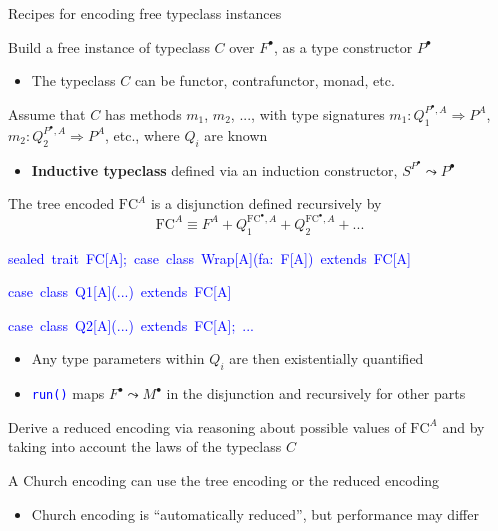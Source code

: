 \documentclass[english,,russian]{beamer}
\newenvironment{lyxcode}
  {\par\begin{list}{}{
    \setlength{\rightmargin}{\leftmargin}
    \setlength{\listparindent}{0pt}%
    \raggedright
    \setlength{\itemsep}{0pt}
    \setlength{\parsep}{0pt}
    \normalfont\ttfamily}%
   \def\{{\char`\{}
   \def\}{\char`\}}
   \def\textasciitilde{\char`\~}
   \item[]}
  {\end{list}}
\begin{document}
\begin{frame}{Recipes for encoding free typeclass instances}
\begin{itemize}
\item Build a free instance of typeclass $C$ over $F^{\bullet}$, as a
type constructor $P^{\bullet}$ 
\begin{itemize}
\item The typeclass $C$ can be functor, contrafunctor, monad, etc.
\end{itemize}
\item Assume that $C$ has methods $m_{1}$, $m_{2}$, ..., with type signatures
{\footnotesize{}$m_{1}:Q_{1}^{P^{\bullet},A}\Rightarrow P^{A}$},
{\footnotesize{}$m_{2}:Q_{2}^{P^{\bullet},A}\Rightarrow P^{A}$},
etc., where $Q_{i}$ are known
\begin{itemize}
\item \textbf{Inductive typeclass} defined via an induction constructor,
$S^{P^{\bullet}}\leadsto P^{\bullet}$
\end{itemize}
\item The tree encoded $\text{FC}^{A}$ is a disjunction defined recursively
by{\footnotesize{}
\[
\text{FC}^{A}\equiv F^{A}+Q_{1}^{\text{FC}^{\bullet},A}+Q_{2}^{\text{FC}^{\bullet},A}+...
\]
}{\footnotesize\par}
\begin{lyxcode}
{\footnotesize{}\vspace{-0.35cm}}\textcolor{blue}{\footnotesize{}sealed~trait~FC{[}A{]};~case~class~Wrap{[}A{]}(fa:~F{[}A{]})~extends~FC{[}A{]}}{\footnotesize\par}

\textcolor{blue}{\footnotesize{}case~class~Q1{[}A{]}(...)~extends~FC{[}A{]}}{\footnotesize\par}

\textcolor{blue}{\footnotesize{}case~class~Q2{[}A{]}(...)~extends~FC{[}A{]};~...}{\footnotesize\par}
\end{lyxcode}
\begin{itemize}
\item Any type parameters within $Q_{i}$ are then existentially quantified
\item \texttt{\textcolor{blue}{\footnotesize{}run()}} maps $F^{\bullet}\leadsto M^{\bullet}$
in the disjunction and recursively for other parts
\end{itemize}
\item Derive a reduced encoding via reasoning about possible values of $\text{FC}^{A}$
and by taking into account the laws of the typeclass $C$
\item A Church encoding can use the tree encoding or the reduced encoding
\begin{itemize}
\item Church encoding is ``automatically reduced'', but performance may
differ
\end{itemize}
\end{itemize}
\end{frame}
\end{document}

